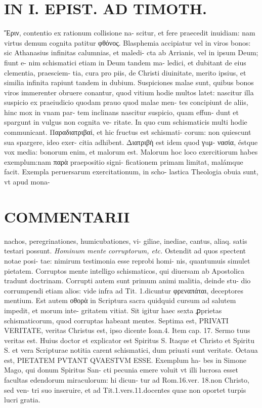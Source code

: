 \documentclass{article}
\begin{document}
\begin{pages}
\section*{IN I. EPIST. AD TIMOTH. }
\marginpar{[ p.153 ]}\pstart Ἔριν, contentio ex rationum collisione na- scitur, et fere praecedit inuidiam: nam virtus demum cognita patitur φθόνος.  \pend\pstart Blasphemia accipiatur vel in viros bonos: sic Athanasius infinitas calumnias, et maledi- cta ab Arrianis, vel in ipsum Deum; fiunt e- nim schismatici etiam in Deum tandem ma- ledici, et dubitant de eius clementia, praesciem- tia, cura pro piis, de Christi diuinitate, merito ipsius, et similia infinita rapiunt tandem in dubium.  \pend\pstart Suspiciones malae sunt, quibus bonos viros immerenter obruere conantur, quod vitium hodie multos latet: nascitur illa suspicio ex praeiudicio quodam prauo quod malae men- tes concipiunt de aliis, hinc mox in vnam par- tem inclinans nascitur suspicio, quam effun- dunt et spargunt in vulgus non cognita ve- ritate. In quo cum schismaticis multi hodie communicant.  \pend\pstart Παραδιατριβαί, et hic fructus est schismati- corum: non quiescunt sua spargere, ideo exer- citia adhibent. Διατριβὴ est idem quod γuμ- νασία, éstque vox media: bonorum enim, et malorum est. Malorum hoc loco exercitiorum habes exemplum:nam παρὰ praepositio signi- ficationem primam limitat, malámque facit. Exempla peruersarum exercitationum, in scho- lastica Theologia obuia sunt, vt apud mona-  \pend
\marginpar{[ p.154 ]}
\section*{COMMENTARII }\pstart nachos, peregrinationes, humicubationes, vi- giliae, inediae, cantus, aliaq. satis testari possunt.  \pend
\textit{Hominum mente corruptorum, etc. }\pstart Ostendit ad quos spectent notae posi- tae: nimirum testimonia esse reprobi homi- nis, quantumuis simulet pietatem. Corruptos mente intelligo schismaticos, qui diuersam ab Apostolica tradunt doctrinam. Corrupti autem sunt primum animi malitia, deinde stu- dio corrumpendi etiam alios: vide infra ad Tit. 1.dicuntur φρεναπάται, deceptores mentium.  \pend\pstart Est autem οθορὰ in Scriptura sacra quidquid cursum ad salutem impedit, et morum inte- gritatem vitiat. Sit igitur haec sexta ꝓprietas schismaticorum, quod corruptas habeant mentes.  \pend\pstart Septima est, PRIVATI VERITATE, veritas Christus est, ipso dicente Ioan.4. Item cap. 17. Sermo tuus veritas est. Huius doctor et explicator est Spiritus S. Itaque et Christo et Spiritu S. et vera Scripturae notitia carent schismatici, dum priuati sunt veritate.  \pend\pstart Octaua est, PIETATEM PVTANT QVAESTVM ESSE. Exemplum ha- bes in Simone Mago, qui donum Spiritus San- cti pecunia emere voluit vt illi lucrosa esset facultas edendorum miraculorum: hi dicun- tur ad Rom.16.ver. 18.non Christo, sed ven- tri suo inseruire, et ad Tit.1.vers.11.docentes quae non oportet turpis lucri gratia.  \pend

\end{pages}
\end{document}
